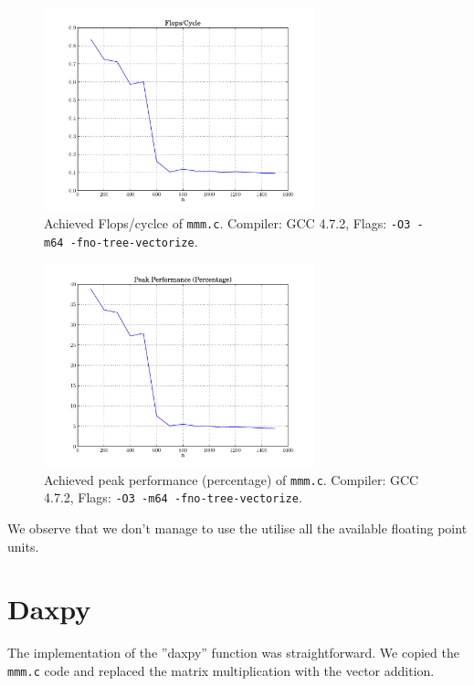 \documentclass[portrait,a4paper]{article}
\begin{document}
\begin{figure}[H]
\centering
\includegraphics[width=0.7\textwidth]{mmm/FlopsCycle.pdf}
\caption{Achieved Flops/cyclce of \lstinline{mmm.c}. Compiler: GCC 4.7.2, Flags: \lstinline{-O3 -m64 -fno-tree-vectorize}.}
\end{figure}


\begin{figure}[H]
\centering
\includegraphics[width=0.7\textwidth]{mmm/PeakPerformancePercentage.pdf}
\caption{Achieved peak performance (percentage) of \lstinline{mmm.c}. Compiler: GCC 4.7.2, Flags: \lstinline{-O3 -m64 -fno-tree-vectorize}.}
\end{figure}
We observe that we don't manage to use the utilise all the available floating point units. 

\section{Daxpy}
The implementation of the ''daxpy'' function was straightforward. We copied the \lstinline{mmm.c} code and replaced the matrix multiplication with the vector addition. 
\end{document}

